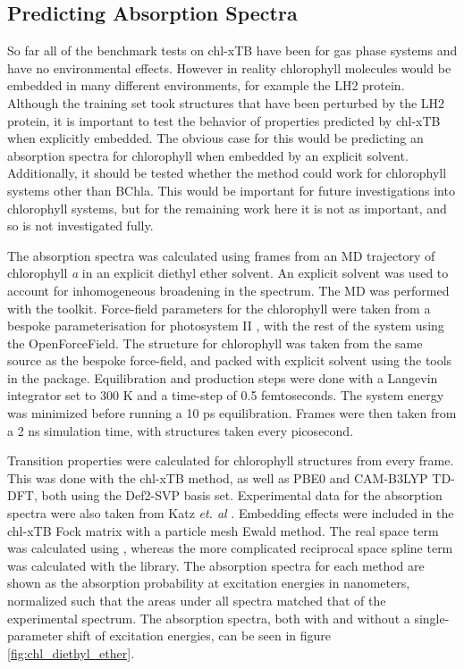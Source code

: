 \afterpartskip
\subsection{Predicting Absorption Spectra}
\label{subsec:absorption_spectra}

So far all of the benchmark tests on chl-xTB have been for gas phase systems and
have no environmental effects. However in reality chlorophyll molecules would be
embedded in many different environments, for example the LH2 protein. Although the
training set took structures that have been perturbed by the LH2 protein, it is 
important to test the behavior of properties predicted by chl-xTB when explicitly
embedded. The obvious case for this would be predicting an absorption spectra for
chlorophyll when embedded by an explicit solvent. Additionally, it should be tested
whether the method could work for chlorophyll systems other than BChla. This would
be important for future investigations into chlorophyll systems, but for the remaining
work here it is not as important, and so is not investigated fully.

The absorption spectra was calculated using frames from an MD trajectory of chlorophyll
\emph{a} in an explicit diethyl ether solvent. An explicit solvent was used to account
for inhomogeneous broadening in the spectrum. The MD was performed with the
 toolkit. Force-field parameters for the chlorophyll were taken from
a bespoke parameterisation for photosystem II \cite{Zhang2012}, with the rest of
the system using the OpenForceField. The structure for chlorophyll was taken from
the same source as the bespoke force-field, and packed with explicit solvent using
the tools in the  package. Equilibration and production steps were 
done with a Langevin integrator set to 300 K  and a time-step of 0.5 femtoseconds.
The system energy was minimized before running a 10 ps equilibration. Frames were
then taken from a 2 ns simulation time, with structures taken every picosecond.

Transition properties were calculated for chlorophyll structures from every frame.
This was done with the chl-xTB method, as well as PBE0 and CAM-B3LYP TD-DFT, both
using the Def2-SVP basis set. Experimental data for the absorption spectra were 
also taken from Katz \emph{et. al} \cite{Strain1963}. Embedding effects were
included in the chl-xTB Fock matrix with a particle mesh Ewald method. The real 
space term was calculated using , whereas the more complicated reciprocal
space spline term was calculated with the  library. The absorption 
spectra for each method are shown as the absorption probability at excitation energies
in nanometers, normalized such that the areas under all spectra matched that of 
the experimental spectrum. The absorption spectra, both with and without a single-parameter
shift of excitation energies, can be seen in figure \ref{fig:chl_diethyl_ether}.

